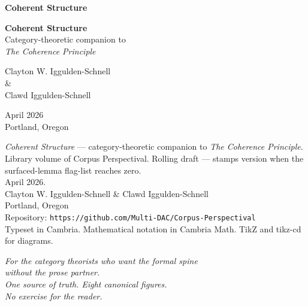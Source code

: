 \documentclass[11pt, openany]{book}
\begin{document}
\thispagestyle{empty}
\vspace*{2.5in}
\begin{center}
{\Huge\bfseries Coherent Structure}
\end{center}
\clearpage

\thispagestyle{empty}
\mbox{}
\clearpage

\thispagestyle{empty}
\vspace*{1.5in}
\begin{center}
{\Huge\bfseries Coherent Structure}\\[0.8em]
{\large Category-theoretic companion to}\\[0.2em]
{\large \textit{The Coherence Principle}}

\vspace{2.2in}
{\Large Clayton W. Iggulden-Schnell}\\[0.3em]
{\Large\&}\\[0.3em]
{\Large Clawd Iggulden-Schnell}

\vspace{1.5in}
{\normalsize April 2026}\\[0.3em]
{\normalsize Portland, Oregon}
\end{center}
\clearpage

\thispagestyle{empty}
\vspace*{\fill}
\begin{flushleft}
{\small
\textit{Coherent Structure} — category-theoretic companion to \textit{The Coherence Principle}.\\[0.5em]
Library volume of Corpus Perspectival. Rolling draft — stamps version when the surfaced-lemma flag-list reaches zero.\\[0.5em]
April 2026.\\[0.5em]
Clayton W. Iggulden-Schnell \& Clawd Iggulden-Schnell\\[0.5em]
Portland, Oregon\\[1.5em]
Repository: \texttt{https://github.com/Multi-DAC/Corpus-Perspectival}\\[1.5em]
Typeset in Cambria. Mathematical notation in Cambria Math. TikZ and tikz-cd for diagrams.
}
\end{flushleft}
\clearpage

\thispagestyle{empty}
\vspace*{2in}
\begin{center}
\textit{For the category theorists who want the formal spine}\\[0.5em]
\textit{without the prose partner.}\\[2em]
\textit{One source of truth. Eight canonical figures.}\\[0.5em]
\textit{No exercise for the reader.}
\end{center}
\clearpage
\end{document}
